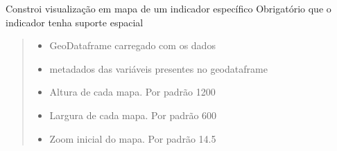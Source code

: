 \documentclass[letterpaper,10pt,brazil]{sphinxmanual}
\begin{document}
\begin{fulllineitems}
\begin{fulllineitems}
\label{\detokenize{api_gen/apiModulo.api_visualizacao:apiModulo.api_visualizacao.ApiVis.visMapaDados}}
\pysigstartsignatures
{}
\pysigstopsignatures
\sphinxAtStartPar
Constroi visualização em mapa de um indicador específico
Obrigatório que o indicador tenha suporte espacial
\begin{quote}\begin{description}
\begin{itemize}
\item {} 
\sphinxAtStartPar
{} \textendash{} GeoDataframe carregado com os dados

\item {} 
\sphinxAtStartPar
{} \textendash{} metadados das variáveis presentes no geodataframe

\item {} 
\sphinxAtStartPar
{} \textendash{} Altura de cada mapa. Por padrão 1200

\item {} 
\sphinxAtStartPar
{} \textendash{} Largura de cada mapa. Por padrão 600

\item {} 
\sphinxAtStartPar
{} \textendash{} Zoom inicial do mapa. Por padrão 14.5

\end{itemize}

\end{description}\end{quote}

\end{fulllineitems}



\end{fulllineitems}
\end{document}
